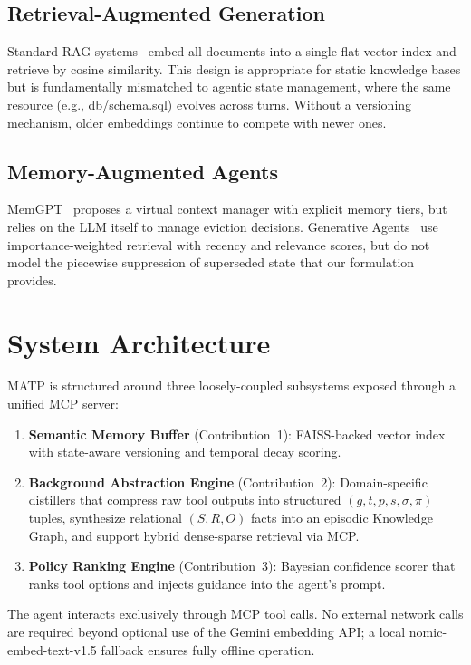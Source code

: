 \documentclass[lettersize,journal]{IEEEtran}
\begin{document}
\subsection{Retrieval-Augmented Generation}
Standard RAG systems~\cite{lewis2020retrieval} embed all documents into a single flat vector index and retrieve by cosine similarity. This design is appropriate for static knowledge bases but is fundamentally mismatched to agentic state management, where the same resource (e.g., db/schema.sql) evolves across turns. Without a versioning mechanism, older embeddings continue to compete with newer ones.

\subsection{Memory-Augmented Agents}
MemGPT~\cite{packer2023memgpt} proposes a virtual context manager with explicit memory tiers, but relies on the LLM itself to manage eviction decisions. Generative Agents~\cite{park2023generative} use importance-weighted retrieval with recency and relevance scores, but do not model the piecewise suppression of superseded state that our formulation provides.

\section{System Architecture}

MATP is structured around three loosely-coupled subsystems exposed through a unified MCP server:

\begin{enumerate}
    \item \textbf{Semantic Memory Buffer} (Contribution~1): FAISS-backed vector index with state-aware versioning and temporal decay scoring.
    \item \textbf{Background Abstraction Engine} (Contribution~2): Domain-specific distillers that compress raw tool outputs into structured $(g, t, p, s, \sigma, \pi)$ tuples, synthesize relational $(S, R, O)$ facts into an episodic Knowledge Graph, and support hybrid dense-sparse retrieval via MCP.
    \item \textbf{Policy Ranking Engine} (Contribution~3): Bayesian confidence scorer that ranks tool options and injects guidance into the agent's prompt.
\end{enumerate}

The agent interacts exclusively through MCP tool calls. No external network calls are required beyond optional use of the Gemini embedding API; a local nomic-embed-text-v1.5 fallback ensures fully offline operation.
\end{document}
